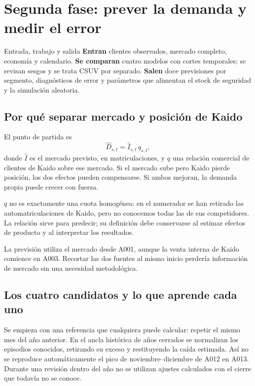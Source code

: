 \section{Segunda fase: prever la demanda y medir el error}\label{sec:prevision}

\begin{idea}{Entrada, trabajo y salida}
\textbf{Entran} clientes observados, mercado completo, economía y calendario.
\textbf{Se comparan} cuatro modelos con cortes temporales; se revisan sesgos y
se trata CSUV por separado. \textbf{Salen} doce previsiones por segmento,
diagnósticos de error y parámetros que alimentan el stock de seguridad y la
simulación aleatoria.
\end{idea}

\subsection{Por qué separar mercado y posición de Kaido}
El punto de partida es
\begin{equation}\label{eq:mercado-cuota}
 \widehat D_{s,t}=\widehat I_{s,t}\,q_{s,t},
\end{equation}
donde $\widehat I$ es el mercado previsto, en matriculaciones, y $q$ una relación
comercial de clientes de Kaido sobre ese mercado. Si el mercado sube pero Kaido
pierde posición, los dos efectos pueden compensarse. Si ambos mejoran, la demanda
propia puede crecer con fuerza.

$q$ no es exactamente una cuota homogénea: en el numerador se han retirado las
automatriculaciones de Kaido, pero no conocemos todas las de sus competidores.
La relación sirve para predecir; su definición debe conservarse al estimar efectos
de producto y al interpretar los resultados.

La previsión utiliza el mercado desde A001, aunque la venta interna de Kaido
comience en A003. Recortar las dos fuentes al mismo inicio perdería información
de mercado sin una necesidad metodológica.

\subsection{Los cuatro candidatos y lo que aprende cada uno}
Se empieza con una referencia que cualquiera puede calcular: repetir el mismo
mes del año anterior. En el ancla histórica de años cerrados se normalizan los
episodios conocidos, retirando su exceso y restituyendo la caída estimada. Así no
se reproduce automáticamente el pico de noviembre--diciembre de A012 en A013.
Durante una revisión dentro del año no se utilizan ajustes calculados con el
cierre que todavía no se conoce.

